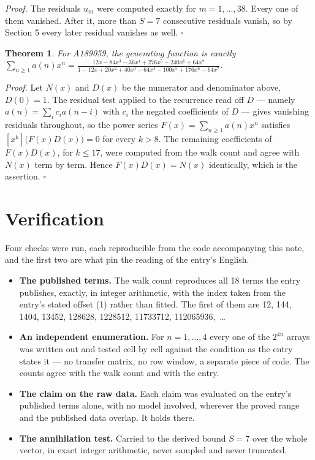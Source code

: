 \documentclass[11pt]{article}
\newtheorem{theorem}{Theorem}
\theoremstyle{definition}
\begin{document}
{\itshape Proof.} The residuals $u_m$ were computed exactly for $m = 1,\dots,38$. Every one of them vanished. After it, more than $S = 7$ consecutive residuals vanish, so by Section 5 every later residual vanishes as well. $\square$

\begin{theorem} For A189059, the generating function is exactly $\sum_{n\ge 1} a(n)x^n = \frac{12x - 84x^{3} - 36x^{4} + 276x^{5} - 240x^{6} + 64x^{7}}{1 - 12x + 20x^{2} + 40x^{3} - 64x^{4} - 100x^{5} + 176x^{6} - 64x^{7}}$.\end{theorem}

{\itshape Proof.} Let $N(x)$ and $D(x)$ be the numerator and denominator above, $D(0)=1$. The residual test applied to the recurrence read off $D$ --- namely $a(n) = \sum_i c_i a(n-i)$ with $c_i$ the negated coefficients of $D$ --- gives vanishing residuals throughout, so the power series $F(x)=\sum_{n\ge 1}a(n)x^n$ satisfies $[x^k]\bigl(F(x)D(x)\bigr) = 0$ for every $k > 8$. The remaining coefficients of $F(x)D(x)$, for $k \le 17$, were computed from the walk count and agree with $N(x)$ term by term. Hence $F(x)D(x) = N(x)$ identically, which is the assertion. $\square$

\section{Verification}

Four checks were run, each reproducible from the code accompanying this note, and the first two are what pin the reading of the entry's English.

\begin{itemize}

\item {\bfseries The published terms.} The walk count reproduces all 18 terms the entry publishes, exactly, in integer arithmetic, with the index taken from the entry's stated offset (1) rather than fitted. The first of them are 12, 144, 1404, 13452, 128628, 1228512, 11733712, 112065936,~\dots

\item {\bfseries An independent enumeration.} For $n = 1,\dots,4$ every one of the $2^{4n}$ arrays was written out and tested cell by cell against the condition as the entry states it --- no transfer matrix, no row window, a separate piece of code. The counts agree with the walk count and with the entry.

\item {\bfseries The claim on the raw data.} Each claim was evaluated on the entry's published terms alone, with no model involved, wherever the proved range and the published data overlap. It holds there.

\item {\bfseries The annihilation test.} Carried to the derived bound $S = 7$ over the whole vector, in exact integer arithmetic, never sampled and never truncated.

\end{itemize}
\end{document}
